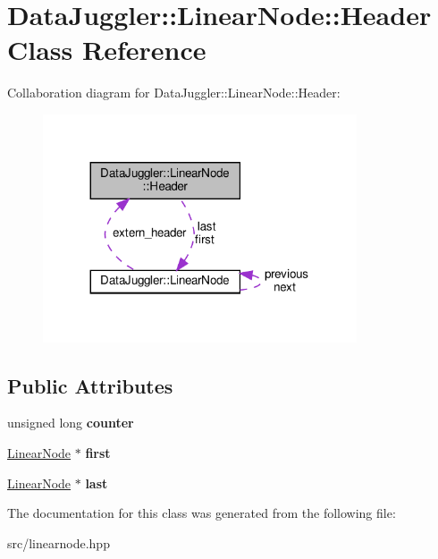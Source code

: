 \hypertarget{classDataJuggler_1_1LinearNode_1_1Header}{}\section{Data\+Juggler\+:\+:Linear\+Node\+:\+:Header Class Reference}
\label{classDataJuggler_1_1LinearNode_1_1Header}


Collaboration diagram for Data\+Juggler\+:\+:Linear\+Node\+:\+:Header\+:\nopagebreak
\begin{figure}[H]
\begin{center}
\leavevmode
\includegraphics[width=263pt]{classDataJuggler_1_1LinearNode_1_1Header__coll__graph}
\end{center}
\end{figure}
\subsection*{Public Attributes}
\begin{DoxyCompactItemize}
\item 
\mbox{\label{classDataJuggler_1_1LinearNode_1_1Header_a48cf985f9164743e49353c6225632d82}} 
unsigned long {\bfseries counter}
\item 
\mbox{\label{classDataJuggler_1_1LinearNode_1_1Header_a4684228438569bb1e624eca59d038770}} 
\hyperlink{classDataJuggler_1_1LinearNode}{Linear\+Node} $\ast$ {\bfseries first}
\item 
\mbox{\label{classDataJuggler_1_1LinearNode_1_1Header_a5396351809b5b69c2dcab50ef817bfe1}} 
\hyperlink{classDataJuggler_1_1LinearNode}{Linear\+Node} $\ast$ {\bfseries last}
\end{DoxyCompactItemize}


The documentation for this class was generated from the following file\+:\begin{DoxyCompactItemize}
\item 
src/linearnode.\+hpp\end{DoxyCompactItemize}
